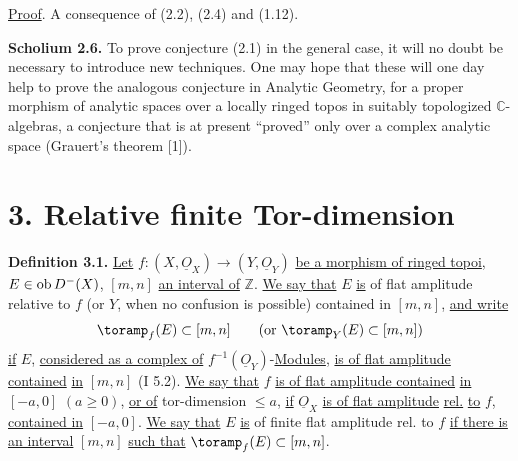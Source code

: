 %
\uline{Proof}. A consequence of (2.2), (2.4) and (1.12).

\textbf{Scholium 2.6.} To prove conjecture (2.1) in the general case, it will no doubt be necessary to introduce new techniques. One may hope that these will one day help to prove the analogous conjecture in Analytic Geometry, for a proper morphism of analytic spaces over a locally ringed topos in suitably topologized \(\mathbb C\)-algebras, a conjecture that is at present ``proved'' only over a complex analytic space (Grauert's theorem [1]).

\section*{3. Relative finite Tor-dimension}

\textbf{Definition 3.1.} \uline{Let} \(f:(X,\underline{O}_X)\longrightarrow(Y,\underline{O}_Y)\) \uline{be a morphism of ringed topoi}, \(E\in\operatorname{ob} D^{-}(X)\), \([m,n]\) \uline{an interval of} \(\mathbb Z\). \uline{We say that} \(E\) \uline{is} of flat amplitude relative to \(f\) (or \(Y\), when no confusion is possible) contained in \([m,n]\), \uline{and write}
\[
  \toramp_f(E)\subset[m,n]\qquad(\text{or }\toramp_Y(E)\subset[m,n])
\]
\uline{if} \(E\), \uline{considered as a complex of} \(f^{-1}(\underline{O}_Y)\)-\uline{Modules}, \uline{is of flat amplitude contained} \uline{in} \([m,n]\) (I 5.2). \uline{We say that} \(f\) \uline{is of flat amplitude contained} \uline{in} \([-a,0]\) \((a\geq0)\), \uline{or of} tor-dimension \(\leq a\), \uline{if} \(\underline{O}_X\) \uline{is of flat amplitude} \uline{rel.} \uline{to} \(f\), \uline{contained in} \([-a,0]\). \uline{We say that} \(E\) \uline{is} of finite flat amplitude rel. to \(f\) \uline{if there is an interval} \([m,n]\) \uline{such that} \(\toramp_f(E)\subset[m,n]\).

